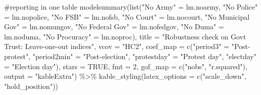 \documentclass[
  letterpaper,
  DIV=11,
  numbers=noendperiod]{scrartcl}
\newenvironment{Shaded}{\begin{snugshade}}{\end{snugshade}}
\newcommand{\AttributeTok}[1]{\textcolor[rgb]{0.40,0.45,0.13}{#1}}
\newcommand{\CommentTok}[1]{\textcolor[rgb]{0.37,0.37,0.37}{#1}}
\newcommand{\ConstantTok}[1]{\textcolor[rgb]{0.56,0.35,0.01}{#1}}
\newcommand{\DecValTok}[1]{\textcolor[rgb]{0.68,0.00,0.00}{#1}}
\newcommand{\FunctionTok}[1]{\textcolor[rgb]{0.28,0.35,0.67}{#1}}
\newcommand{\NormalTok}[1]{\textcolor[rgb]{0.00,0.23,0.31}{#1}}
\newcommand{\OtherTok}[1]{\textcolor[rgb]{0.00,0.23,0.31}{#1}}
\newcommand{\SpecialCharTok}[1]{\textcolor[rgb]{0.37,0.37,0.37}{#1}}
\newcommand{\StringTok}[1]{\textcolor[rgb]{0.13,0.47,0.30}{#1}}
\begin{document}
\begin{Shaded}
\begin{Highlighting}[]
\CommentTok{\#reporting in one table}
\FunctionTok{modelsummary}\NormalTok{(}\FunctionTok{list}\NormalTok{(}\StringTok{"No Army"} \OtherTok{=}\NormalTok{ lm.noarmy, }\StringTok{"No Police"} \OtherTok{=}\NormalTok{ lm.nopolice, }
                  \StringTok{"No FSB"} \OtherTok{=}\NormalTok{ lm.nofsb, }\StringTok{"No Court"} \OtherTok{=}\NormalTok{ lm.nocourt, }
                  \StringTok{"No Municipal Gov"} \OtherTok{=}\NormalTok{ lm.nomungov, }\StringTok{"No Federal Gov"} \OtherTok{=}\NormalTok{ lm.nofedgov, }
                  \StringTok{"No Duma"} \OtherTok{=}\NormalTok{ lm.noduma, }\StringTok{"No Procuracy"} \OtherTok{=}\NormalTok{ lm.noproc),}
             \AttributeTok{title =} \StringTok{"Robustness check on Gov\textquotesingle{}t Trust: Leave{-}one{-}out indices"}\NormalTok{,}
             \AttributeTok{vcov =} \StringTok{"HC2"}\NormalTok{,}
             \AttributeTok{coef\_map =} \FunctionTok{c}\NormalTok{(}\StringTok{"period3"} \OtherTok{=} \StringTok{"Post{-}protest"}\NormalTok{, }
             \StringTok{"period2min"} \OtherTok{=} \StringTok{"Post{-}election"}\NormalTok{, }\StringTok{"protestday"} \OtherTok{=} \StringTok{"Protest day"}\NormalTok{, }
             \StringTok{"electday"} \OtherTok{=} \StringTok{"Election day"}\NormalTok{),}
             \AttributeTok{stars =} \ConstantTok{TRUE}\NormalTok{, }\AttributeTok{fmt =} \DecValTok{2}\NormalTok{, }\AttributeTok{gof\_map =} \FunctionTok{c}\NormalTok{(}\StringTok{"nobs"}\NormalTok{, }\StringTok{"r.squared"}\NormalTok{),}
             \AttributeTok{output =} \StringTok{"kableExtra"}\NormalTok{) }\SpecialCharTok{\%\textgreater{}\%} 
   \FunctionTok{kable\_styling}\NormalTok{(}\AttributeTok{latex\_options =} \FunctionTok{c}\NormalTok{(}\StringTok{"scale\_down"}\NormalTok{, }\StringTok{"hold\_position"}\NormalTok{))}
\end{Highlighting}
\end{Shaded}
\end{document}
